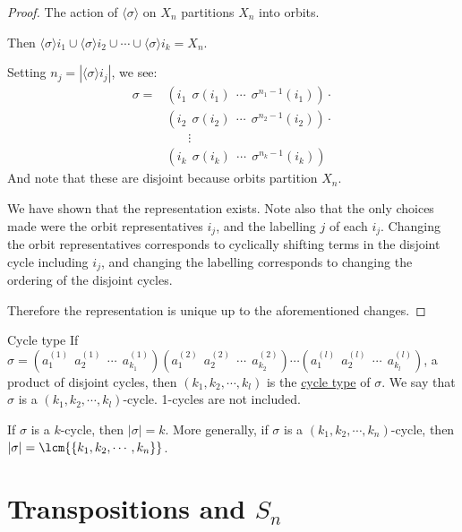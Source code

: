 \documentclass[../Main.tex]{subfiles}
\begin{document}
\begin{proof}
    The action of $\langle \sigma \rangle$ on $X_n$ partitions $X_n$ into orbits.\par
    Then $\langle \sigma \rangle i_1 \cup \langle \sigma \rangle i_2 \cup \cdots \cup \langle \sigma \rangle i_k = X_n$.\par
    Setting $n_j = |\langle \sigma \rangle i_j|$, we see:
    \begin{align*}
        \sigma = &(i_1~~\sigma(i_1)~~\cdots~~\sigma^{n_1 - 1}(i_1)) \cdot \\
        &(i_2~~\sigma(i_2)~~\cdots~~\sigma^{n_2 - 1}(i_2)) \cdot \\
        &~~~~~~~~\vdots \\
        &(i_k~~\sigma(i_k)~~\cdots~~\sigma^{n_k - 1}(i_k))
    \end{align*}
    And note that these are disjoint because orbits partition $X_n$.\par
    We have shown that the representation exists. Note also that the only choices made were the orbit representatives $i_j$, and the labelling $j$ of each $i_j$. Changing the orbit representatives corresponds to cyclically shifting terms in the disjoint cycle including $i_j$, and changing the labelling corresponds to changing the ordering of the disjoint cycles.\par
    Therefore the representation is unique up to the aforementioned changes.
\end{proof}
\begin{definition}{Cycle type}
    If $\sigma = (a_1^{(1)}~~a_2^{(1)}~~\cdots~~a_{k_1}^{(1)})(a_1^{(2)}~~a_2^{(2)}~~\cdots~~a_{k_2}^{(2)})\cdots(a_1^{(l)}~~a_2^{(l)}~~\cdots~~a_{k_l}^{(l)})$, a product of disjoint cycles, then $(k_1, k_2, \cdots, k_l)$ is the \underline{cycle type} of $\sigma$. We say that $\sigma$ is a $(k_1, k_2, \cdots, k_l)$-cycle. 1-cycles are not included.
\end{definition}
If $\sigma$ is a $k$-cycle, then $|\sigma| = k$. More generally, if $\sigma$ is a $(k_1, k_2, \cdots, k_n)$-cycle, then $|\sigma| = \lcm{\{k_1, k_2, \cdots, k_n\}}$.
\section{Transpositions and \texorpdfstring{$S_n$}{Sn}}
\end{document}
